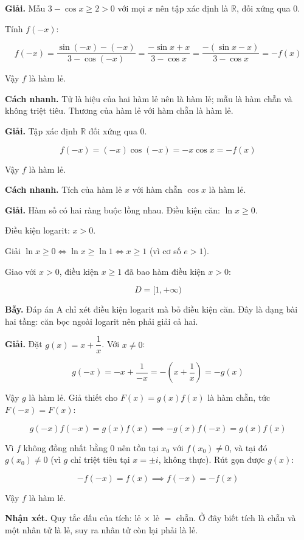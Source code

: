 \documentclass[11pt, a4paper]{article}
\begin{document}
\begin{dapan}[6 — Đáp án A]
\textbf{Giải.} Mẫu $3 - \cos x \ge 2 > 0$ với mọi $x$ nên tập xác định là $\mathbb{R}$, đối xứng qua $0$.

Tính $f(-x)$:

$$f(-x) = \frac{\sin(-x) - (-x)}{3 - \cos(-x)} = \frac{-\sin x + x}{3 - \cos x} = \frac{-(\sin x - x)}{3 - \cos x} = -f(x)$$

Vậy $f$ là hàm lẻ.

\textbf{Cách nhanh.} Tử là hiệu của hai hàm lẻ nên là hàm lẻ; mẫu là hàm chẵn và không triệt tiêu. Thương của hàm lẻ với hàm chẵn là hàm lẻ.
\end{dapan}

\begin{dapan}[7 — Đáp án B]
\textbf{Giải.} Tập xác định $\mathbb{R}$ đối xứng qua $0$.

$$f(-x) = (-x)\cos(-x) = -x\cos x = -f(x)$$

Vậy $f$ là hàm lẻ.

\textbf{Cách nhanh.} Tích của hàm lẻ $x$ với hàm chẵn $\cos x$ là hàm lẻ.
\end{dapan}

\begin{dapan}[8 — Đáp án D]
\textbf{Giải.} Hàm số có hai ràng buộc lồng nhau. Điều kiện căn: $\ln x \ge 0$.

Điều kiện logarit: $x > 0$.

Giải $\ln x \ge 0 \iff \ln x \ge \ln 1 \iff x \ge 1$ (vì cơ số $e > 1$).

Giao với $x > 0$, điều kiện $x \ge 1$ đã bao hàm điều kiện $x > 0$:

$$D = [1, +\infty)$$

\textbf{Bẫy.} Đáp án A chỉ xét điều kiện logarit mà bỏ điều kiện căn. Đây là dạng bài hai tầng: căn bọc ngoài logarit nên phải giải cả hai.
\end{dapan}

\begin{dapan}[9 — Đáp án A]
\textbf{Giải.} Đặt $g(x) = x + \dfrac{1}{x}$. Với $x \neq 0$:

$$g(-x) = -x + \frac{1}{-x} = -\left(x + \frac{1}{x}\right) = -g(x)$$

Vậy $g$ là hàm lẻ. Giả thiết cho $F(x) = g(x)f(x)$ là hàm chẵn, tức $F(-x) = F(x)$:

$$g(-x)f(-x) = g(x)f(x) \implies -g(x)f(-x) = g(x)f(x)$$

Vì $f$ không đồng nhất bằng $0$ nên tồn tại $x_0$ với $f(x_0) \neq 0$, và tại đó $g(x_0) \neq 0$ (vì $g$ chỉ triệt tiêu tại $x = \pm i$, không thực). Rút gọn được $g(x)$:

$$-f(-x) = f(x) \implies f(-x) = -f(x)$$

Vậy $f$ là hàm lẻ.

\textbf{Nhận xét.} Quy tắc dấu của tích: lẻ $\times$ lẻ $=$ chẵn. Ở đây biết tích là chẵn và một nhân tử là lẻ, suy ra nhân tử còn lại phải là lẻ.
\end{dapan}
\end{document}

